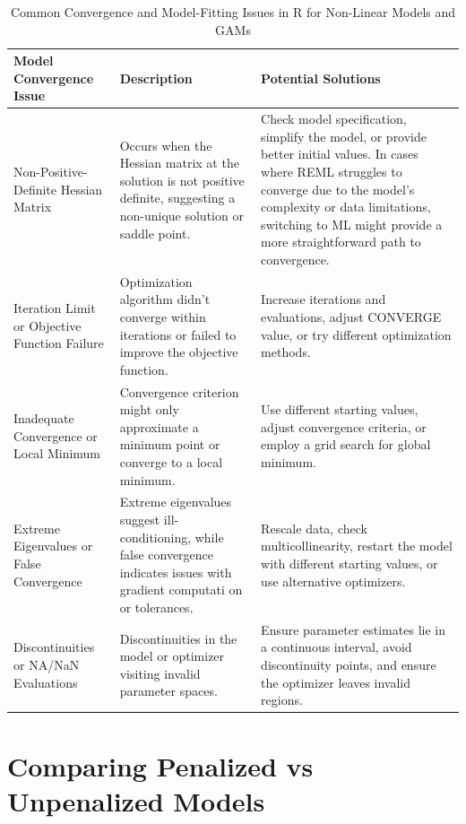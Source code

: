 \documentclass[12pt, twoside,hidelinks]{article}
\theoremstyle{definition}
\numberwithin{equation}{section}
\begin{document}
\begin{table}[H]
\centering
\begin{tabular}{>{\raggedright}p{4.5cm} >{\raggedright}p{6cm} >{\raggedright\arraybackslash}p{5.5cm}}
\toprule
\textbf{Model Convergence Issue} & \textbf{Description} & \textbf{Potential Solutions} \\
\midrule
Non-Positive-Definite Hessian Matrix & Occurs when the Hessian matrix at the solution is not positive definite, suggesting a non-unique solution or saddle point. & Check model specification, simplify the model, or provide better initial values. In cases where REML struggles to converge due to the model's complexity or data limitations, switching to ML might provide a more straightforward path to convergence. \\
\addlinespace
Iteration Limit or Objective Function Failure & Optimization algorithm didn't converge within iterations or failed to improve the objective function. & Increase iterations and evaluations, adjust CONVERGE value, or try different optimization methods. \\
\addlinespace
Inadequate Convergence or Local Minimum & Convergence criterion might only approximate a minimum point or converge to a local minimum. & Use different starting values, adjust convergence criteria, or employ a grid search for global minimum. \\
\addlinespace
Extreme Eigenvalues or False Convergence & Extreme eigenvalues suggest ill-conditioning, while false convergence indicates issues with gradient computati   on or tolerances. & Rescale data, check multicollinearity, restart the model with different starting values, or use alternative optimizers. \\
\addlinespace
Discontinuities or NA/NaN Evaluations & Discontinuities in the model or optimizer visiting invalid parameter spaces. & Ensure parameter estimates lie in a continuous interval, avoid discontinuity points, and ensure the optimizer leaves invalid regions. \\
\bottomrule
\end{tabular}
\caption{Common Convergence and Model-Fitting Issues in R for Non-Linear Models and GAMs}
\label{tab:model_convergence_combined}
\end{table}

\newpage

\section{Comparing Penalized vs Unpenalized Models}
\end{document}

